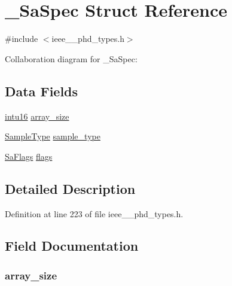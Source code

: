 \hypertarget{struct___sa_spec}{}\section{\+\_\+\+Sa\+Spec Struct Reference}
\label{struct___sa_spec}


{\ttfamily \#include $<$ieee\+\_\+\_\+phd\+\_\+types.\+h$>$}



Collaboration diagram for \+\_\+\+Sa\+Spec\+:
\subsection*{Data Fields}
\begin{DoxyCompactItemize}
\item 
\hyperlink{ieee__11073__phd__types_8h_a3561595d2aa7416532e1c9910abd076d}{intu16} \hyperlink{struct___sa_spec_af37a4261bbe1c5194b502c7f57aecc00}{array\+\_\+size}
\item 
\hyperlink{ieee__11073__phd__types_8h_a51897a577db3ce344259c0c0c3504580}{Sample\+Type} \hyperlink{struct___sa_spec_a936838cd492317d53a4598ecfbef9021}{sample\+\_\+type}
\item 
\hyperlink{ieee__11073__phd__types_8h_a3100f53be97bb8daa66eeafe2ce79d60}{Sa\+Flags} \hyperlink{struct___sa_spec_a603eecbb0ea0f29c05aeaf15134236c5}{flags}
\end{DoxyCompactItemize}


\subsection{Detailed Description}


Definition at line 223 of file ieee\+\_\+\_\+phd\+\_\+types.\+h.



\subsection{Field Documentation}
\hypertarget{struct___sa_spec_af37a4261bbe1c5194b502c7f57aecc00}{}
\subsubsection[{array\+\_\+size}]{ array\+\_\+size}\label{struct___sa_spec_af37a4261bbe1c5194b502c7f57aecc00}


